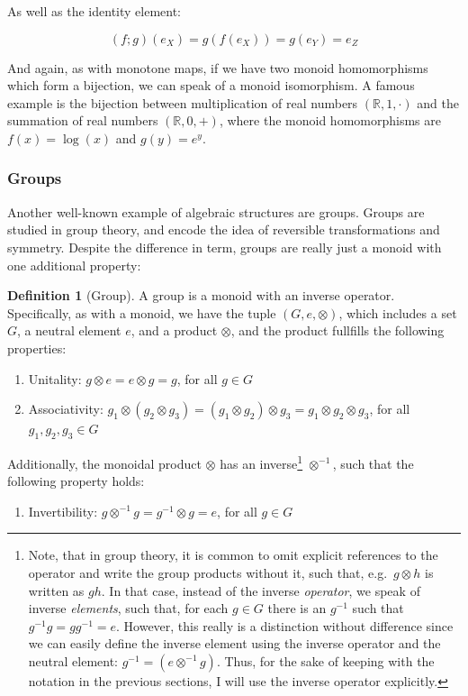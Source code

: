 \documentclass[
  openany]{book}
\providecommand{\tightlist}{%
  \setlength{\itemsep}{0pt}\setlength{\parskip}{0pt}}
\theoremstyle{definition}
\newtheorem{definition}{Definition}[chapter]
\theoremstyle{definition}
\theoremstyle{definition}
\theoremstyle{definition}
\theoremstyle{remark}
\begin{document}
As well as the identity element:

\[(f ;g)(e_X) = g(f(e_X)) = g(e_Y) = e_Z\]

And again, as with monotone maps, if we have two monoid homomorphisms which form a bijection, we can speak of a monoid isomorphism. A famous example is the bijection between multiplication of real numbers \((\mathbb{R}, 1, \cdot)\) and the summation of real numbers \((\mathbb{R}, 0, +)\), where the monoid homomorphisms are \(f(x) = \log(x)\) and \(g(y) = e^y\).

\subsubsection{Groups}\label{groups}

Another well-known example of algebraic structures are groups. Groups are studied in group theory, and encode the idea of reversible transformations and symmetry. Despite the difference in term, groups are really just a monoid with one additional property:

\begin{definition}[Group]

A group is a monoid with an inverse operator. Specifically, as with a monoid, we have the tuple \((G, e, \otimes)\), which includes a set \(G\), a neutral element \(e\), and a product \(\otimes\), and the product fullfills the following properties:

\begin{enumerate}
\def\labelenumi{\arabic{enumi}.}
\tightlist
\item
  Unitality: \(g \otimes e = e \otimes g = g\), for all \(g \in G\)
\item
  Associativity: \(g_1 \otimes (g_2 \otimes g_3) = (g_1 \otimes g_2) \otimes g_3 = g_1 \otimes g_2 \otimes g_3\), for all \(g_1, g_2, g_3 \in G\)
\end{enumerate}

Additionally, the monoidal product \(\otimes\) has an inverse\footnote{Note, that in group theory, it is common to omit explicit references to the operator and write the group products without it, such that, e.g.~\(g \otimes h\) is written as \(gh\). In that case, instead of the inverse \emph{operator}, we speak of inverse \emph{elements}, such that, for each \(g \in G\) there is an \(g^{-1}\) such that \(g^{-1}g = gg^{-1} = e\). However, this really is a distinction without difference since we can easily define the inverse element using the inverse operator and the neutral element: \(g^{-1} = (e \otimes^{-1}g)\). Thus, for the sake of keeping with the notation in the previous sections, I will use the inverse operator explicitly.} \(\otimes^{-1}\), such that the following property holds:

\begin{enumerate}
\def\labelenumi{\arabic{enumi}.}
\setcounter{enumi}{2}
\tightlist
\item
  Invertibility: \(g \otimes^{-1} g = g^{-1} \otimes g = e\), for all \(g \in G\)
\end{enumerate}

\end{definition}
\end{document}
